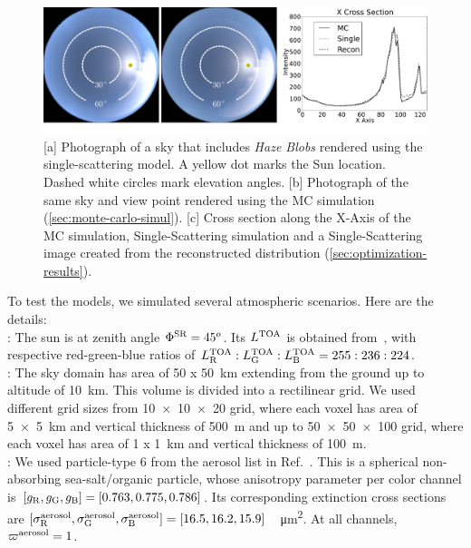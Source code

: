 \documentclass[10pt,letterpaper]{article}
\newcommand{\yoavcomment}[1]{}
\renewcommand{\yoavcomment}[1]{#1} %
\begin{document}
\begin{figure}
  \centering
  \yoavcomment{\includegraphics[width=\linewidth]{images/ref_images.pdf}}
  \caption{\small [a] Photograph of a sky that includes {\em Haze
      Blobs} rendered using the single-scattering model.  A yellow dot
    marks the Sun location. Dashed white circles mark elevation
    angles.  [b] Photograph of the same sky and view point rendered
    using the MC simulation (\cref{sec:monte-carlo-simul}).  [c] Cross
    section along the X-Axis of the MC simulation, Single-Scattering
    simulation and a Single-Scattering image created from the
    reconstructed distribution (\cref{sec:optimization-results}).}
  \label{fig:simulation-results1}
\end{figure}
To test the models, we simulated several atmospheric scenarios. Here
are the details:
\\

: The sun is at zenith angle $\Phi^{\rm
  SR}=45^o$. Its $L^{\rm TOA}$ is obtained
from~\cite{BBradiance,sun_composition}, with respective red-green-blue
ratios of $L^{\rm TOA}_{\rm R}:L^{\rm TOA}_{\rm G}:L^{\rm TOA}_{\rm
  B}=255:236:224$.
\\

: The sky domain has area of \SI{50 x
  50}{\km} extending from the ground up to altitude of
\SI{10}{\km}. This volume is divided into a rectilinear grid. We used
different grid sizes from \num{10 x 10 x 20} grid, where each voxel
has area of \SI{5 x 5}{\km} and vertical thickness of \SI{500}{\metre}
and up to \num{50 x 50 x 100} grid, where each voxel has area of \SI{1
  x 1}{\km} and vertical thickness of \SI{100}{\metre}.
\\

: We used particle-type 6 from the aerosol list
in Ref.~\cite{Martonchik2009}. This is a spherical non-absorbing
sea-salt/organic particle, whose anisotropy parameter per color
channel is $[g_{\rm R},g_{\rm G},g_{\rm B}]=[0.763,0.775,0.786]$. Its
corresponding extinction cross sections are $[\sigma^{\rm
  aerosol}_{\rm R}, \sigma^{\rm aerosol}_{\rm G}, \sigma^{\rm
  aerosol}_{\rm
  B}]=[16.5,16.2,15.9]$~\si[sticky-per]{\per\micro\meter\squared}.  At
all channels, $\varpi^{\rm aerosol}=1$.
\end{document}
